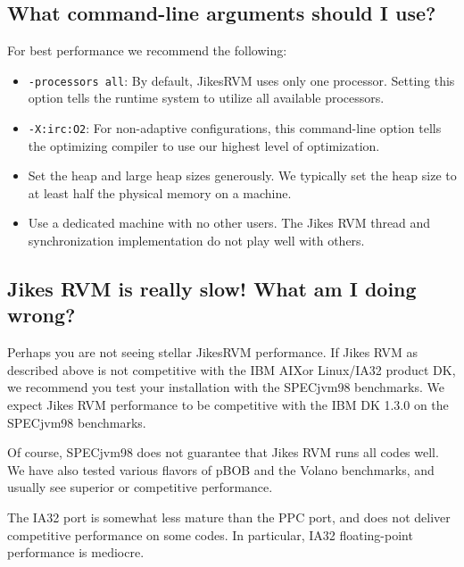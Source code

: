 \subsection{What command-line arguments should I use?}

For best performance we recommend the following:

\begin{itemize}
\item {\tt -processors all}: By default, Jikes\trademark RVM uses only
one processor.  Setting this option tells the runtime system to
utilize all available processors. 
\item {\tt -X:irc:O2}: For non-adaptive configurations, this command-line option tells the optimizing compiler to use our highest level of optimization.
\item Set the heap and large heap sizes generously.  We typically set the heap size to at least half the physical memory on a machine.
\item Use a dedicated machine with no other users.  The Jikes RVM thread and synchronization implementation do not play well with others.
\end{itemize}

\JikesTMFooter

\subsection{Jikes RVM is really slow! What am I doing wrong?}

Perhaps you are not seeing stellar Jikes\trademark RVM performance.
If Jikes RVM as 
described above is not competitive with the IBM AIX\AIXTMFootnote or
Linux/IA32 product DK, we recommend you test your installation with
the SPECjvm98 benchmarks.  We expect Jikes RVM performance to be competitive
with the IBM DK 1.3.0 on the SPECjvm98 benchmarks.

Of course, SPECjvm98 does not guarantee that Jikes RVM runs all codes
well.  We have also tested various flavors of pBOB and the Volano
benchmarks, and usually see superior or competitive performance.

The IA32 port is somewhat less mature than the PPC port, and does not
deliver competitive performance on some codes.  In particular, IA32
floating-point performance is mediocre.

